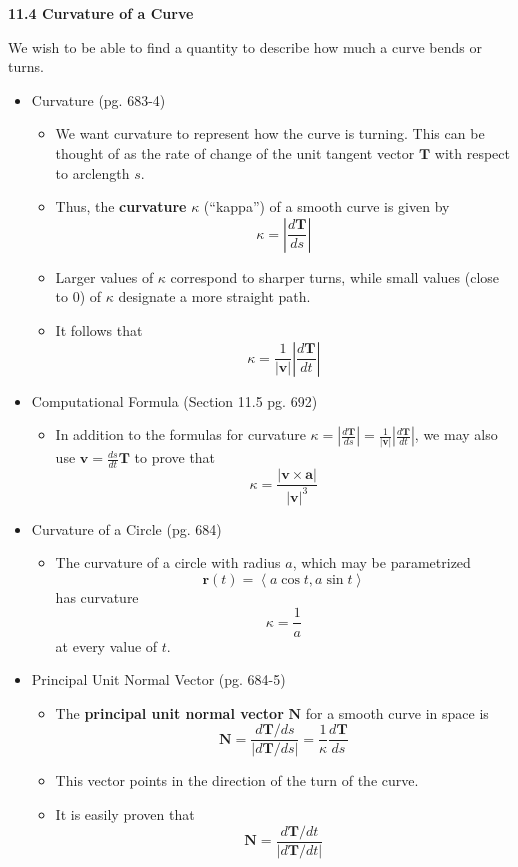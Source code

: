 \documentclass[12pt]{article}
\theoremstyle{plain}
\theoremstyle{definition}
\theoremstyle{remark}
\newcommand{\vect}[1]{\mathbf{#1}}
\begin{document}
	\newpage
	
	\centerline{\bf 11.4 Curvature of a Curve}
	
	We wish to be able to find a quantity to describe how much a curve bends or turns.
	
	\begin{itemize}
	\item Curvature (pg. 683-4)
		\begin{itemize}
		\item We want curvature to represent how the curve is turning. This can be thought of as the rate of change of the unit tangent vector $\vect{T}$ with respect to arclength $s$.
		\item Thus, the \textbf{curvature} $\kappa$ (``kappa'') of a smooth curve is given by \[\kappa = \left|\frac{d\vect{T}}{ds}\right| \]
		\item Larger values of $\kappa$ correspond to sharper turns, while small values (close to $0$) of $\kappa$ designate a more straight path.
		\item It follows that \[\kappa = \frac{1}{|\vect{v}|}\left|\frac{d\vect{T}}{dt}\right|\]
		\end{itemize}
		
	\item Computational Formula (Section 11.5 pg. 692)
	
		\begin{itemize}
		\item In addition to the formulas for curvature $\kappa = \left|\frac{d\vect{T}}{ds}\right| = \frac{1}{|\vect{v}|}\left|\frac{d\vect{T}}{dt}\right|$, we may also  use $\vect{v}=\frac{ds}{dt}\vect{T}$ to prove that \[\kappa = \frac{|\vect{v} \times \vect{a}|}{|\vect{v}|^3}\]
		\end{itemize}
	
	\item Curvature of a Circle (pg. 684)
	
		\begin{itemize}
		\item The curvature of a circle with radius $a$, which may be parametrized \[\vect{r}(t)=\left<a\cos t,a\sin t\right>\] has curvature \[\kappa = \frac{1}{a}\] at every value of $t$.
		\end{itemize}
		
		\newpage
	
	\item Principal Unit Normal Vector (pg. 684-5)
		\begin{itemize}
		\item The \textbf{principal unit normal vector} $\vect{N}$ for a smooth curve in space is \[\vect{N} = \frac{d\vect{T}/ds}{|d\vect{T}/ds|}= \frac{1}{\kappa} \frac{d\vect{T}}{ds}\]
		\item This vector points in the direction of the turn of the curve.
		\item It is easily proven that \[\vect{N} = \frac{d\vect{T}/dt}{|d\vect{T}/dt|}\]
		\end{itemize}
	

\end{itemize}
\end{document}

